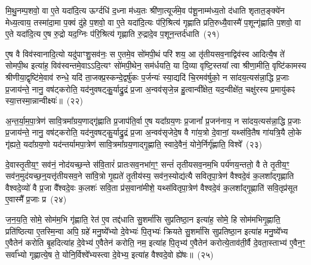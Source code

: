 मि॒थु॒नम्प॒शवो॒ वा ए॒ते यदा॑दि॒त्य ऊर्ग्दधि॑ द॒ध्ना म॑ध्य॒तः श्री॑णा॒त्यूर्ज॑मे॒व प॑शू॒नाम्म॑ध्य॒तो द॑धाति शृतात॒ङ्क्ये॑न मेध्य॒त्वाय॒ तस्मा॑दा॒मा प॒क्वं दु॑हे प॒शवो॒ वा ए॒ते यदा॑दि॒त्यः प॑रि॒श्रित्य॑ गृह्णाति प्रति॒रुध्यै॒वास्मै॑ प॒शून्गृ॑ह्णाति प॒शवो॒ वा ए॒ते यदा॑दि॒त्य ए॒ष रु॒द्रो यद॒ग्निः प॑रि॒श्रित्य॑ गृह्णाति रु॒द्रादे॒व प॒शून॒न्तर्द॑धाति~(२१)

ए॒ष वै विव॑स्वानादि॒त्यो यदु॑पाꣳशु॒सव॑नः॒ स ए॒तमे॒व सो॑मपी॒थं परि॑ शय॒ आ तृ॑तीयसव॒नाद्विव॑स्व आदित्यै॒ष ते॑ सोमपी॒थ इत्या॑ह॒ विव॑स्वन्तमे॒वाऽऽदि॒त्यꣳ सो॑मपी॒थेन॒ सम॑र्धयति॒ या दि॒व्या वृष्टि॒स्तया᳚ त्वा श्रीणा॒मीति॒ वृष्टि॑कामस्य श्रीणीया॒द्वृष्टि॑मे॒वाव॑ रुन्धे॒ यदि॑ ता॒जक्प्र॒स्कन्दे॒द्वर्\mbox{}षु॑कः प॒र्जन्यः॑ स्या॒द्यदि॑ चि॒रमव॑र्\mbox{}षुको॒ न सा॑दय॒त्यस॑न्ना॒द्धि प्र॒जाः प्र॒जाय॑न्ते॒ नानु॒ वष॑ट्करोति॒ यद॑नुवषट्कु॒॒र्याद्रु॒द्रं प्र॒जा अ॒न्वव॑सृजे॒न्न हु॒त्वान्वी᳚क्षेत॒ यद॒न्वीक्षे॑त॒ चक्षु॑रस्य प्र॒मायु॑कꣴ स्या॒त्तस्मा॒न्नान्वीक्ष्यः॑॥~(२२)

{\anuvakamend[{ए॒व य॒ज्ञाज्ज॒रायु॒ तदे॒व तद॒न्तर्द॑धाति॒ न स॒प्तविꣳ॑शतिश्च}]}%

अ॒न्त॒र्या॒म॒पा॒त्रेण॑ सावि॒त्रमा᳚ग्रय॒णाद्गृ॑ह्णाति प्र॒जा\-प॑ति॒र्वा ए॒ष यदा᳚ग्रय॒णः प्र॒जानां᳚ प्र॒जन॑नाय॒ न सा॑दय॒त्यस॑न्ना॒द्धि प्र॒जाः प्र॒जाय॑न्ते॒ नानु॒ वष॑ट्करोति॒ यद॑नुवषट्कु॒र्याद्रु॒द्रं प्र॒जा अ॒न्वव॑सृजेदे॒ष वै गा॑य॒त्रो दे॒वानां॒ यथ्स॑वि॒तैष गा॑यत्रि॒यै लो॒के गृ॑ह्यते॒ यदा᳚ग्रय॒णो यद॑न्तर्यामपा॒त्रेण॑ सावि॒त्रमा᳚ग्रय॒णाद्गृ॒ह्णाति॒ स्वादे॒वैनं॒ योने॒र्निर्गृ॑ह्णाति॒ विश्वे᳚~(२३)

दे॒वास्तृ॒तीय॒ꣳ॒ सव॑नं॒ नोद॑यच्छ॒न्ते स॑वि॒तारं॑ प्रातःसव॒नभा॑ग॒ꣳ॒ सन्तं॑ तृतीयसव॒नम॒भि पर्य॑णय॒न्ततो॒ वै ते तृ॒तीय॒ꣳ॒ सव॑न॒मुद॑यच्छ॒न्॒यत्तृ॑तीयसव॒ने सा॑वि॒त्रो गृ॒ह्यते॑ तृ॒तीय॑स्य॒ सव॑न॒स्योद्य॑त्यै सवितृपा॒त्रेण॑ वैश्वदे॒वं क॒लशा᳚द्गृह्णाति वैश्वदे॒व्यो॑ वै प्र॒जा वै᳚श्वदे॒वः क॒लशः॑ सवि॒ता प्र॑स॒वाना॑मीशे॒ यथ्स॑वितृपा॒त्रेण॑ वैश्वदे॒वं क॒लशा᳚द्गृ॒ह्णाति॑ सवि॒तृप्र॑सूत ए॒वास्मै᳚ प्र॒जाः प्र~(२४)

ज॒न॒य॒ति॒ सोमे॒ सोम॑म॒भि गृ॑ह्णाति॒ रेत॑ ए॒व तद्द॑धाति सु॒शर्मा॑सि सुप्रतिष्ठा॒न इत्या॑ह॒ सोमे॒ हि सोम॑मभिगृ॒ह्णाति॒ प्रति॑ष्ठित्या ए॒तस्मि॒न्वा अपि॒ ग्रहे॑ मनु॒ष्ये᳚भ्यो दे॒वेभ्यः॑ पि॒तृभ्यः॑ क्रियते सु॒शर्मा॑सि सुप्रतिष्ठा॒न इत्या॑ह मनु॒ष्ये᳚भ्य ए॒वैतेन॑ करोति बृ॒हदित्या॑ह दे॒वेभ्य॑ ए॒वैतेन॑ करोति॒ नम॒ इत्या॑ह पि॒तृभ्य॑ ए॒वैतेन॑ करोत्ये॒ताव॑ती॒र्वै दे॒वता॒स्ताभ्य॑ ए॒वैन॒ꣳ॒ सर्वा᳚भ्यो गृह्णात्ये॒ष ते॒ योनि॒र्विश्वे᳚भ्यस्त्वा दे॒वेभ्य॒ इत्या॑ह वैश्वदे॒वो ह्ये॑षः॥~(२५)

{\anuvakamend[{विश्वे॒ प्र पि॒तृभ्य॑ ए॒वैतेन॑ करो॒त्येका॒न्नविꣳ॑श॒तिश्च॑}]}%

